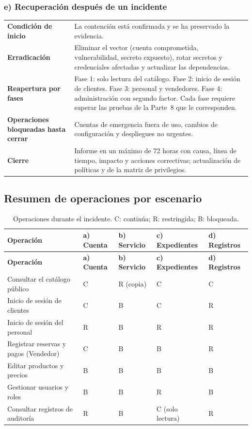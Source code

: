 \documentclass[12pt,letterpaper]{article}
\newenvironment{tabla}{\begin{singlespace}\small\setlength{\tabcolsep}{4pt}\renewcommand{\arraystretch}{1.15}}{\end{singlespace}}
\begin{document}
\subsubsection{e) Recuperación después de un incidente}

\begin{tabla}
\begin{longtable}{L{3.4cm}L{10.2cm}}
\toprule
\textbf{Condición de inicio} & La contención está confirmada y se ha preservado la evidencia.\\
\textbf{Erradicación} & Eliminar el vector (cuenta comprometida, vulnerabilidad, secreto expuesto), rotar secretos y credenciales afectadas y actualizar las dependencias.\\
\textbf{Reapertura por fases} & Fase 1: solo lectura del catálogo. Fase 2: inicio de sesión de clientes. Fase 3: personal y vendedores. Fase 4: administración con segundo factor. Cada fase requiere superar las pruebas de la Parte~8 que le corresponden.\\
\textbf{Operaciones bloqueadas hasta cerrar} & Cuentas de emergencia fuera de uso, cambios de configuración y despliegues no urgentes.\\
\textbf{Cierre} & Informe en un máximo de 72 horas con causa, línea de tiempo, impacto y acciones correctivas; actualización de políticas y de la matriz de privilegios.\\
\bottomrule
\end{longtable}
\end{tabla}

\subsection{Resumen de operaciones por escenario}

\begin{tabla}
\begin{longtable}{L{4.8cm}C{2.0cm}C{2.0cm}C{2.0cm}C{2.0cm}}
\caption{Operaciones durante el incidente. C: continúa; R: restringida; B: bloqueada.}\label{tab:resumen5}\\
\toprule
\textbf{Operación} & \textbf{a) Cuenta} & \textbf{b) Servicio} & \textbf{c) Expedientes} & \textbf{d) Registros}\\
\midrule
\endfirsthead
\toprule
\textbf{Operación} & \textbf{a) Cuenta} & \textbf{b) Servicio} & \textbf{c) Expedientes} & \textbf{d) Registros}\\
\midrule
\endhead
Consultar el catálogo público & C & R (copia) & C & C\\
Inicio de sesión de clientes & C & B & C & R\\
Inicio de sesión del personal & R & B & R & R\\
Registrar reservas y pagos (Vendedor) & C & B & B & R\\
Editar productos y precios & B & B & B & B\\
Gestionar usuarios y roles & B & B & R & B\\
Consultar registros de auditoría & R & B & C (solo lectura) & R\\
\bottomrule
\end{longtable}
\end{tabla}
\end{document}
